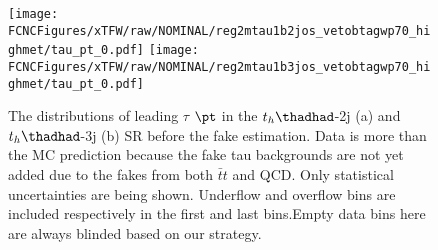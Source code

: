 \begin{figure}[H]
\centering
\texttt{[image: \\FCNCFigures/xTFW/raw/NOMINAL/reg2mtau1b2jos\_vetobtagwp70\_highmet/tau\_pt\_0.pdf]}
\texttt{[image: \\FCNCFigures/xTFW/raw/NOMINAL/reg2mtau1b3jos\_vetobtagwp70\_highmet/tau\_pt\_0.pdf]}
\caption{ The distributions of leading $\tau$ $\pt$ in the $t_h\thadhad$-2j (a) and $t_h\thadhad$-3j (b) SR before the fake estimation. Data is more than the MC prediction because the fake tau backgrounds are not yet added due to the fakes from both $\bar{t}t$ and QCD. Only
statistical uncertainties are being shown. Underflow and overflow bins are included respectively in the first and last bins.Empty data bins here are always blinded based on our strategy.}
\label{fig:intro_os_pre_hadhad}
\end{figure}

